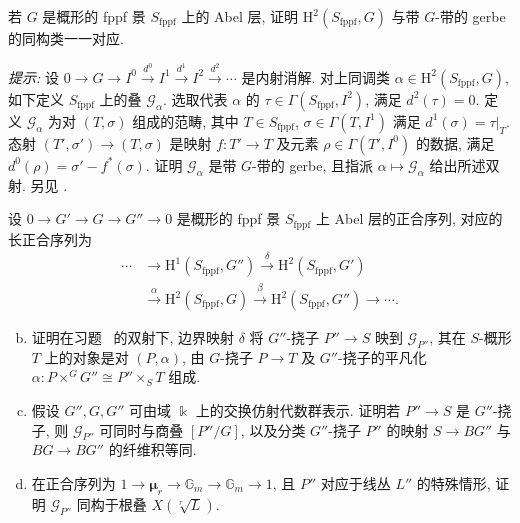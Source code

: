 \begin{exercise}[Gerbe]\label{src:7.4.44}
若 $G$ 是概形的 fppf 景 $S_{\mathrm{fppf}}$ 上的 Abel 层, 证明 $\mathrm H^2(S_{\mathrm{fppf}},G)$ 与带 $G$-带的 gerbe 的同构类一一对应.

\textit{提示:} 设 $0\to G\to I^0\xrightarrow{d^0}I^1\xrightarrow{d^1}I^2\xrightarrow{d^2}\cdots$ 是内射消解. 对上同调类 $\alpha\in\mathrm H^2(S_{\mathrm{fppf}},G)$, 如下定义 $S_{\mathrm{fppf}}$ 上的叠 $\mathcal G_\alpha$. 选取代表 $\alpha$ 的 $\tau\in\Gamma(S_{\mathrm{fppf}},I^2)$, 满足 $d^2(\tau)=0$. 定义 $\mathcal G_\alpha$ 为对 $(T,\sigma)$ 组成的范畴, 其中 $T\in S_{\mathrm{fppf}}$, $\sigma\in\Gamma(T,I^1)$ 满足 $d^1(\sigma)=\tau|_T$. 态射 $(T',\sigma')\to(T,\sigma)$ 是映射 $f:T'\to T$ 及元素 $\rho\in\Gamma(T',I^0)$ 的数据, 满足 $d^0(\rho)=\sigma'-f^*(\sigma)$. 证明 $\mathcal G_\alpha$ 是带 $G$-带的 gerbe, 且指派 $\alpha\mapsto\mathcal G_\alpha$ 给出所述双射. 另见 \cite[\S2.5]{dJ03}.
\end{exercise}
\begin{exercise}[续论 gerbe]\label{src:7.4.45}
设 $0\to G'\to G\to G''\to0$ 是概形的 fppf 景 $S_{\mathrm{fppf}}$ 上 Abel 层的正合序列, 对应的长正合序列为
\[
\begin{aligned}
\cdots&\longrightarrow\mathrm H^1(S_{\mathrm{fppf}},G'')\xrightarrow{\delta}\mathrm H^2(S_{\mathrm{fppf}},G')\\
&\xrightarrow{\alpha}\mathrm H^2(S_{\mathrm{fppf}},G)\xrightarrow{\beta}\mathrm H^2(S_{\mathrm{fppf}},G'')\longrightarrow\cdots.
\end{aligned}
\]
\begin{enumerate}[(a)]\setcounter{enumi}{1}
\item 证明在习题~ 的双射下, 边界映射 $\delta$ 将 $G''$-挠子 $P''\to S$ 映到 $\mathcal G_{P''}$, 其在 $S$-概形 $T$ 上的对象是对 $(P,\alpha)$, 由 $G$-挠子 $P\to T$ 及 $G''$-挠子的平凡化 $\alpha:P\times^G G''\cong P''\times_S T$ 组成.
\item 假设 $G'',G,G''$ 可由域 $\Bbbk$ 上的交换仿射代数群表示. 证明若 $P''\to S$ 是 $G''$-挠子, 则 $\mathcal G_{P''}$ 可同时与商叠 $[P''/G]$, 以及分类 $G''$-挠子 $P''$ 的映射 $S\to BG''$ 与 $BG\to BG''$ 的纤维积等同.
\item 在正合序列为 $1\to\boldsymbol\mu_r\to\mathbb G_m\to\mathbb G_m\to1$, 且 $P''$ 对应于线丛 $L''$ 的特殊情形, 证明 $\mathcal G_{P''}$ 同构于根叠 $X(\sqrt[r]{L})$.
\end{enumerate}
\end{exercise}
